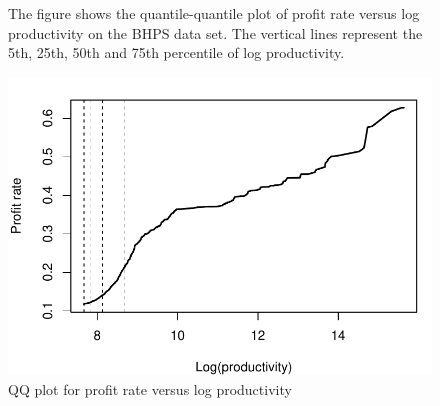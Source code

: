 \documentclass[11pt,letterpaper]{article}
\newcommand{\floatintro}[1]{
  
  \vspace*{0.1in}
  
  {\footnotesize

    #1
    
  }
  
  \vspace*{0.1in} }
\begin{document}
\begin{enumerate}
\begin{figure}
  \floatintro{The figure shows the quantile-quantile plot of profit
    rate versus log productivity on the BHPS data set. The vertical
    lines represent the 5th, 25th, 50th and 75th percentile of log
    productivity.}  \centering
  \includegraphics[scale=.6]{./pics/prod_profit.pdf}
  \caption{QQ plot for profit rate versus log productivity}
  \label{fig:qqplot_profit}
\end{figure}
\end{enumerate}
\newpage

\end{document}

